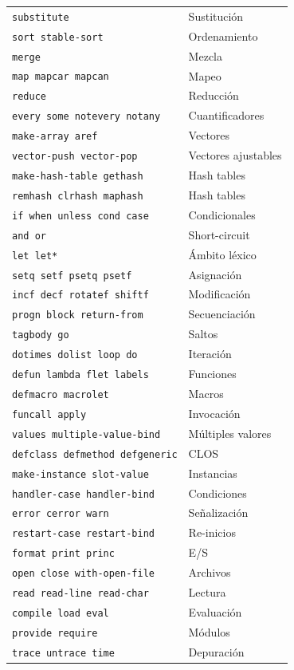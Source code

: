 \begin{center}
\begin{longtable}{ll}
\texttt{substitute} & Sustitución \\
\texttt{sort stable-sort} & Ordenamiento \\
\texttt{merge} & Mezcla \\
\texttt{map mapcar mapcan} & Mapeo \\
\texttt{reduce} & Reducción \\
\texttt{every some notevery notany} & Cuantificadores \\
\texttt{make-array aref} & Vectores \\
\texttt{vector-push vector-pop} & Vectores ajustables \\
\texttt{make-hash-table gethash} & Hash tables \\
\texttt{remhash clrhash maphash} & Hash tables \\
\texttt{if when unless cond case} & Condicionales \\
\texttt{and or} & Short-circuit \\
\texttt{let let*} & Ámbito léxico \\
\texttt{setq setf psetq psetf} & Asignación \\
\texttt{incf decf rotatef shiftf} & Modificación \\
\texttt{progn block return-from} & Secuenciación \\
\texttt{tagbody go} & Saltos \\
\texttt{dotimes dolist loop do} & Iteración \\
\texttt{defun lambda flet labels} & Funciones \\
\texttt{defmacro macrolet} & Macros \\
\texttt{funcall apply} & Invocación \\
\texttt{values multiple-value-bind} & Múltiples valores \\
\texttt{defclass defmethod defgeneric} & CLOS \\
\texttt{make-instance slot-value} & Instancias \\
\texttt{handler-case handler-bind} & Condiciones \\
\texttt{error cerror warn} & Señalización \\
\texttt{restart-case restart-bind} & Re-inicios \\
\texttt{format print princ} & E/S \\
\texttt{open close with-open-file} & Archivos \\
\texttt{read read-line read-char} & Lectura \\
\texttt{compile load eval} & Evaluación \\
\texttt{provide require} & Módulos \\
\texttt{trace untrace time} & Depuración \\
\end{longtable}
\end{center}

